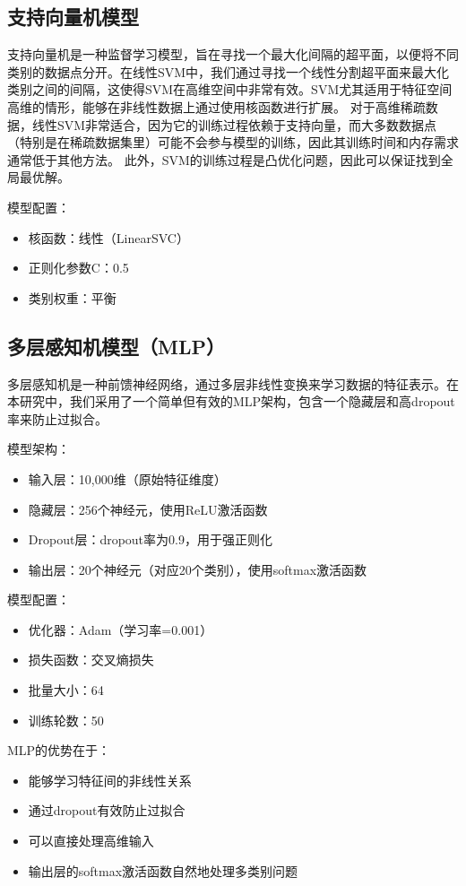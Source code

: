 \documentclass[11pt,a4paper]{article}
\begin{document}
\subsection{支持向量机模型}
支持向量机是一种监督学习模型，旨在寻找一个最大化间隔的超平面，以便将不同类别的数据点分开。在线性SVM中，我们通过寻找一个线性分割超平面来最大化类别之间的间隔，这使得SVM在高维空间中非常有效。SVM尤其适用于特征空间高维的情形，能够在非线性数据上通过使用核函数进行扩展。
对于高维稀疏数据，线性SVM非常适合，因为它的训练过程依赖于支持向量，而大多数数据点（特别是在稀疏数据集里）可能不会参与模型的训练，因此其训练时间和内存需求通常低于其他方法。
此外，SVM的训练过程是凸优化问题，因此可以保证找到全局最优解。

模型配置：
\begin{itemize}
    \item 核函数：线性（LinearSVC）
    \item 正则化参数C：0.5
    \item 类别权重：平衡
\end{itemize}

\subsection{多层感知机模型（MLP）}
多层感知机是一种前馈神经网络，通过多层非线性变换来学习数据的特征表示。在本研究中，我们采用了一个简单但有效的MLP架构，包含一个隐藏层和高dropout率来防止过拟合。

模型架构：
\begin{itemize}
    \item 输入层：10,000维（原始特征维度）
    \item 隐藏层：256个神经元，使用ReLU激活函数
    \item Dropout层：dropout率为0.9，用于强正则化
    \item 输出层：20个神经元（对应20个类别），使用softmax激活函数
\end{itemize}

模型配置：
\begin{itemize}
    \item 优化器：Adam（学习率=0.001）
    \item 损失函数：交叉熵损失
    \item 批量大小：64
    \item 训练轮数：50
\end{itemize}

MLP的优势在于：
\begin{itemize}
    \item 能够学习特征间的非线性关系
    \item 通过dropout有效防止过拟合
    \item 可以直接处理高维输入
    \item 输出层的softmax激活函数自然地处理多类别问题
\end{itemize}
\end{document}
